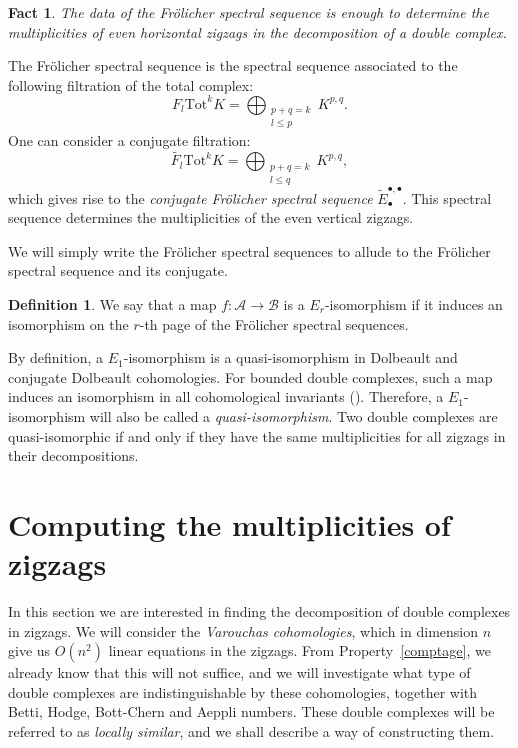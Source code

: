 \documentclass[leqno]{article}
\newtheorem{Fact}[equation]{Fact}
\theoremstyle{definition}
\newtheorem{Definition}[equation]{Definition}
\numberwithin{equation}{section}
\begin{document}
\begin{Fact}
The data of the Frölicher spectral sequence is enough to determine the multiplicities of even horizontal zigzags in the decomposition of a double complex.
\end{Fact}
The Frölicher spectral sequence is the spectral sequence associated to the following filtration of the total complex:
\[
F_l \text{Tot}^k K
=
\bigoplus_{
\substack{
p+q=k \\
l \leqslant p}
}
K^{p, q}.
\]
One can consider a conjugate filtration:
\[
\tilde{F_l} \text{Tot}^k K
=
\bigoplus_{
\substack{
p+q=k \\
l \leqslant q}
}
K^{p, q},
\]
which gives rise to the {\sl conjugate Frölicher spectral sequence} $\tilde{E}^{\bullet, \bullet}_{\bullet}$. This spectral sequence determines the multiplicities of the even vertical zigzags.

We will simply write the Frölicher spectral sequences to allude to the Frölicher spectral sequence and its conjugate.
\begin{Definition}
We say that a map $f: \mathcal{A} \longrightarrow \mathcal{B}$ is a $E_r$-isomorphism if it induces an isomorphism on the $r$-th page of the Frölicher spectral sequences. 
\end{Definition}
By definition, a $E_1$-isomorphism is a quasi-isomorphism in Dolbeault and conjugate Dolbeault cohomologies. For bounded double complexes, such a map induces an isomorphism in all cohomological invariants (\cite{Ste}). Therefore, a $E_1$-isomorphism will also be called a {\sl quasi-isomorphism}. Two double complexes are quasi-isomorphic if and only if they have the same multiplicities for all zigzags in their decompositions.
\section{Computing the multiplicities of zigzags}
In this section we are interested in finding the decomposition of double complexes in zigzags. We will consider the {\sl Varouchas cohomologies}, which in dimension $n$ give us $O(n^2)$ linear equations in the zigzags. From Property~\ref{comptage}, we already know that this will not suffice, and we will investigate what type of double complexes are indistinguishable by these cohomologies, together with Betti, Hodge, Bott-Chern and Aeppli numbers. These double complexes will be referred to as {\sl locally similar}, and we shall describe a way of constructing them.
\end{document}
